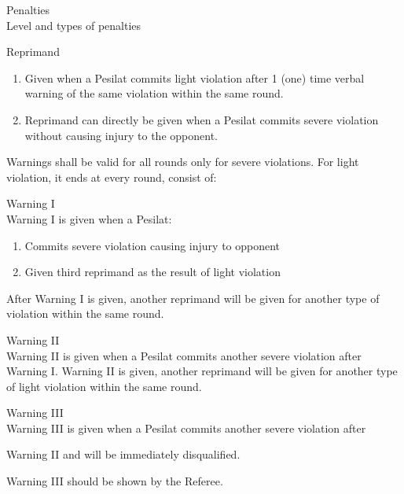 \begin{legal}
\begin{legal}
    \item Penalties\\
    Level and types of penalties
        \begin{legal}
        \item Reprimand
            \begin{enumerate}[label=\alph*.]
            \item Given when a Pesilat commits light violation after 1 (one) time verbal warning of
                  the same violation within the same round.
            \item Reprimand can directly be given when a Pesilat commits severe violation without
                  causing injury to the opponent.
            \end{enumerate}

        \item Warnings shall be valid for all rounds only for severe violations. 
              For light violation, it ends at every round, consist of:
            \begin{legal}
            \item Warning I \\
            Warning I is given when a Pesilat:
                \begin{enumerate}[label=\alph*.]
                \item Commits severe violation causing injury to opponent
                \item Given third reprimand as the result of light violation
                \end{enumerate}

            After Warning I is given, another reprimand will be given for another type of
            violation within the same round.

            \item Warning II \\
            Warning II is given when a Pesilat commits another severe violation after Warning I.
            Warning II is given, another reprimand will be given for another type of light
            violation within the same round.

            \item Warning III \\
            Warning III is given when a Pesilat commits another severe violation after

            Warning II and will be immediately disqualified.

            Warning III should be shown by the Referee.


\end{legal}
\end{legal}
\end{legal}
\end{legal}
